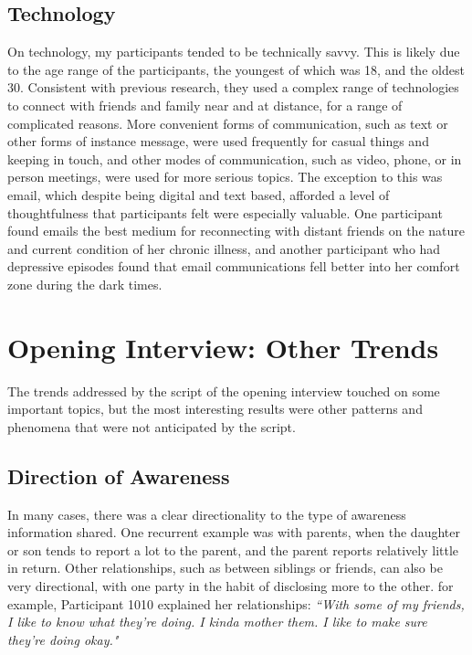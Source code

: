   \subsection{Technology}
  On technology,
  my participants tended to be technically savvy.
  This is likely due to the age range of the participants,
  the youngest of which was 18, and the oldest 30.
  Consistent with previous research,
  they used a complex range of technologies to connect
  with friends and family near and at distance,
  for a range of complicated reasons.
  More convenient forms of communication,
  such as text or other forms of instance message,
  were used frequently for casual things and keeping in touch,
  and other modes of communication, such as video, phone, or in person meetings,
  were used for more serious topics.
  The exception to this was email,
  which despite being digital and text based, 
  afforded a level of thoughtfulness that participants
  felt were especially valuable.
  One participant found emails the best medium for reconnecting
  with distant friends on the nature and current condition of her
  chronic illness,
  and another participant who had depressive episodes found that
  email communications fell better into her comfort zone during the dark times.

\section{Opening Interview: Other Trends}
  The trends addressed by the script of the opening interview touched on
  some important topics, but the most interesting results
  were other patterns and phenomena
  that were not anticipated by the script.

  \subsection{Direction of Awareness}
  In many cases, there was a clear directionality to the type of awareness
  information shared.
  One recurrent example was with parents,
  when the daughter or son tends to report a lot to the parent,
  and the parent reports relatively little in return.
  Other relationships, such as between siblings or friends,
  can also be very directional,
  with one party in the habit of disclosing more to the other.
  for example, Participant 1010 explained her relationships:
  \textit{
  ``With some of my friends, I like to know what they're doing.
  I kinda mother them.
  I like to make sure they're doing okay."
  }

